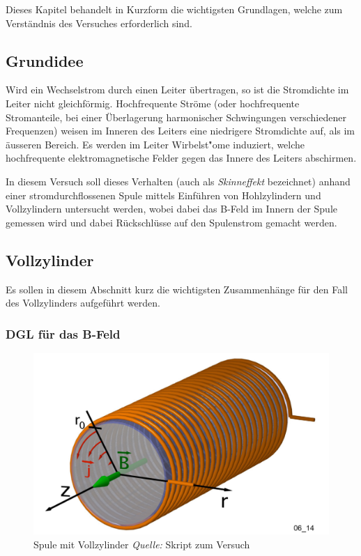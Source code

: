 Dieses Kapitel  behandelt in Kurzform  die wichtigsten Grundlagen,  welche zum
Verst\"andnis des Versuches erforderlich sind.

\subsection{Grundidee}
\label{sec:arbgru:subsec:grundidee}

Wird ein Wechselstrom durch einen  Leiter \"ubertragen, so ist die Stromdichte
im Leiter  nicht gleichf\"ormig.   Hochfrequente Str\"ome  (oder hochfrequente
Stromanteile, bei einer \"Uberlagerung harmonischer Schwingungen verschiedener
Frequenzen) weisen  im Inneren  des Leiters  eine niedrigere  Stromdichte auf,
als  im  \"ausseren Bereich. Es  werden  im  Leiter Wirbelst\r"ome  induziert,
welche hochfrequente  elektromagnetische Felder  gegen das Innere  des Leiters
abschirmen.

In  diesem   Versuch  soll  dieses  Verhalten   (auch  als  \emph{Skinneffekt}
bezeichnet)  anhand einer  stromdurchflossenen Spule  mittels Einf\"uhren  von
Hohlzylindern und Vollzylindern  untersucht werden, wobei dabei  das B-Feld im
Innern der Spule gemessen wird und dabei R\"uckschl\"usse auf den Spulenstrom
gemacht werden.


\subsection{Vollzylinder}
\label{sec:arbgru:subsec:vollzylinder}

Es sollen in  diesem Abschnitt kurz die wichtigsten  Zusammenh\"ange f\"ur den
Fall des Vollzylinders aufgef\"uhrt werden.

\subsubsection{DGL f\"ur das B-Feld}
\label{sec:arbgru:subsec:vollzylinder:herleitDGL}


\begin{figure}[th!]
    \centering
    \includegraphics[width=.5\textwidth]{images/spule-vollzylinder.png}
    \caption{Spule mit Vollzylinder \emph{Quelle:} Skript zum Versuch}
\end{figure}


